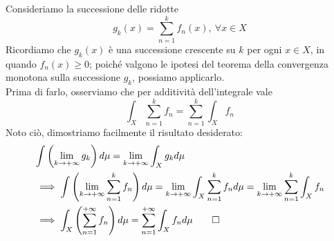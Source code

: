 \begin{demonstration}
	Consideriamo la successione delle ridotte
	\begin{equation*}
		g_k\left(x\right)=\sum_{n=1}^{k}f_n\left(x\right),\ \forall x\in X
	\end{equation*}
	Ricordiamo che $g_k\left(x\right)$ è una successione crescente su $k$ per ogni $x\in X$, in quando $f_n\left(x\right)\geq 0$; poiché valgono le ipotesi del teorema della convergenza monotona sulla successione $g_k$, possiamo applicarlo.\\
	Prima di farlo, osserviamo che per additività dell'integrale vale
	\begin{equation*}
		\int_X \sum_{n=1}^{k}f_n=\sum_{n=1}^{k}\int_X f_n
	\end{equation*}
	Noto ciò, dimostriamo facilmente il risultato desiderato: 
	\begin{align*}
		&\int \left(\lim_{k\to+\infty}g_k\right)d\mu=\lim_{k\to+\infty}\int_X g_kd\mu\\
		&\implies \int \left(\lim_{k\to+\infty}\sum_{n=1}^{k}f_n\right)d\mu=\lim_{k\to+\infty}\int_X \sum_{n=1}^{k}f_nd\mu=\lim_{k\to+\infty}\sum_{n=1}^{k}\int_X f_n\\
		&\implies \int_X\left(\sum_{n=1}^{+\infty}f_n\right)d\mu=\sum_{n=1}^{+\infty}\int_Xf_nd\mu\qedhere
	\end{align*}
\end{demonstration}
